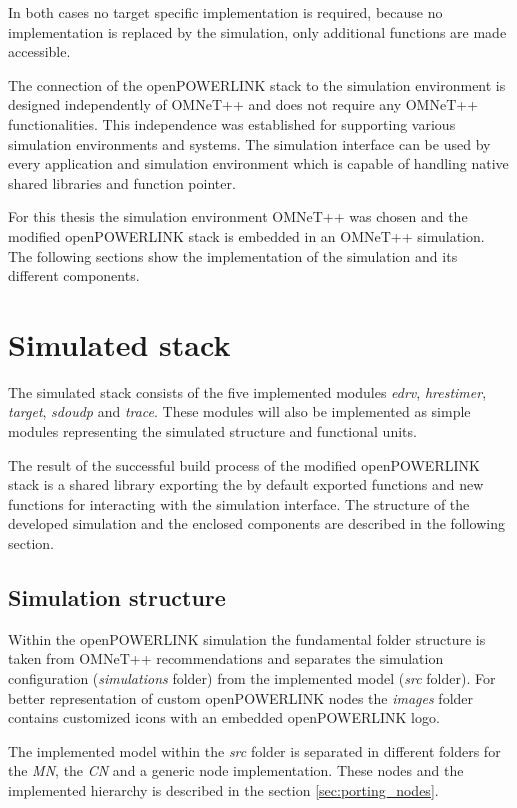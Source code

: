 In both cases no target specific implementation is required, because no implementation is replaced by the simulation, only additional functions are made accessible.

The connection of the openPOWERLINK stack to the simulation environment is designed independently of OMNeT++ and does not require any OMNeT++ functionalities.
This independence was established for supporting various simulation environments and systems.
The simulation interface can be used by every application and simulation environment which is capable of handling native shared libraries and function pointer.

For this thesis the simulation environment OMNeT++ was chosen and the modified openPOWERLINK stack is embedded in an OMNeT++ simulation.
The following sections show the implementation of the simulation and its different components.

\section{Simulated stack}
\label{sec:porting_stack}
The simulated stack consists of the five implemented modules \emph{edrv}, \emph{hrestimer}, \emph{target}, \emph{sdoudp} and \emph{trace}.
These modules will also be implemented as simple modules representing the simulated structure and functional units.

\begin{sloppypar}
The result of the successful build process of the modified openPOWERLINK stack is a shared library exporting the by default exported functions and new functions for interacting with the simulation interface.
The structure of the developed simulation and the enclosed components are described in the following section.
\end{sloppypar}

\subsection{Simulation structure}
\label{sec:porting_stack_simstructure}
Within the openPOWERLINK simulation the fundamental folder structure is taken from OMNeT++ recommendations and separates the simulation configuration (\emph{simulations} folder) from the implemented model (\emph{src} folder).
For better representation of custom openPOWERLINK nodes the \emph{images} folder contains customized icons with an embedded openPOWERLINK logo.

The implemented model within the \emph{src} folder is separated in different folders for the \emph{MN}, the \emph{CN} and a generic node implementation.
These nodes and the implemented hierarchy is described in the section \ref{sec:porting_nodes}.

